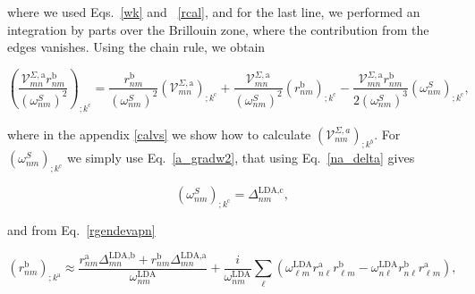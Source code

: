 \documentclass[11pt,draft]{article}
\begin{document}
where we used Eqs.~\eqref{wk} and ~\eqref{rcal}, and for the last line, we performed an
integration by parts over the Brillouin zone, where the contribution from the edges vanishes.\cite{aschcroft} Using the chain rule, we obtain

\begin{equation}\label{chrn}
\left(\frac{\mathcal{V}^{\Sigma,\text{a}}_{mn}r^{\text{b}}_{nm}}{(\omega^S_{nm})^2}\right)_{;k^{\text{c}}} = \frac{r^{\text{b}}_{nm}}{(\omega^S_{nm})^2}\left(\mathcal{V} ^{\Sigma,\text{a}}_{mn}\right)_{;k^{\text{c}}} + \frac{\mathcal{V}^{\Sigma,\text{a}}_{mn}}{(\omega^S_{nm})^2}\left(r^{\text{b}}_{nm}\right)_{;k^{\text{c}}} - \frac{\mathcal{V}^{\Sigma,\text{a}}_{mn}r^{\text{b}}_{nm}}{2(\omega^S_{nm})^3}\left(\omega^S_{nm}\right)_{;k^{\text{c}}},
\end{equation}

where in the appendix \ref{calvs} we show how to calculate $(\mathcal{V}^{\Sigma,a}_{nm})_{;k^b}$. For $\left(\omega^S_{nm}\right)_{;k^{\text{c}}}$ we simply use Eq.~\eqref{a_gradw2}, that using Eq.~\eqref{na_delta} gives

\begin{equation}\label{eli.1}
\left(\omega^S_{nm}\right)_{;k^{\text{c}}} = \Delta^{\text{LDA},\text{c}}_{nm},
\end{equation}

and from Eq.~\eqref{rgendevapn}

\begin{equation}\label{eli.2}
(r^{\text{b}}_{nm})_{;k^{\text{a}}} \approx \frac{r^{\text{a}}_{nm}\Delta^{\text{LDA},\text{b}}_{mn} + r^{\text{b}}_{nm}\Delta^{\text{LDA},\text{a}}_{mn}}{\omega^\text{LDA}_{nm}} + \frac{i}{\omega^\text{LDA}_{nm}}\sum_{\ell}\left(\omega^\text{LDA}_{\ell m}r^{\text{a}}_{n\ell}r^{\text{b}}_{\ell m} - \omega^\text{LDA}_{n\ell}r^{\text{b}}_{n\ell}r^{\text{a}}_{\ell m}\right),
\end{equation}
\end{document}
